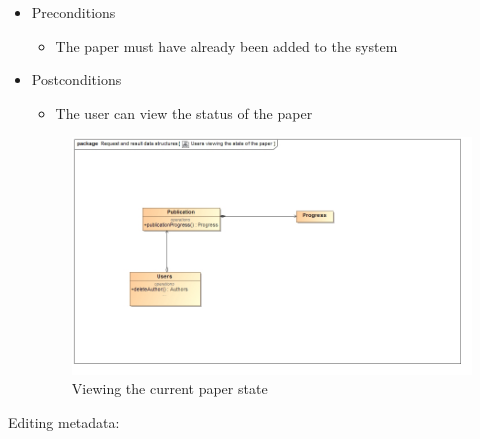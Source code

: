 \documentclass[a4paper,12pt]{article}
\begin{document}
\begin{itemize}
    \item Preconditions
    \begin{itemize}
        \item The paper must have already been added to the system
    \end{itemize}
    \item Postconditions
    \begin{itemize}
        \item The user can view the status of the paper
    \end{itemize}
    
    \begin{figure}[H]
    \centering
    \caption{Viewing the current paper state}
    \includegraphics[width=1\textwidth]{use-case/user-viewing-paper-state.png}
    \end{figure}
\end{itemize}
Editing metadata:
\end{document}
